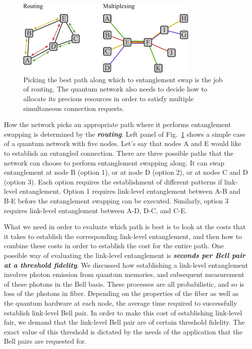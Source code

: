 \begin{figure}[t]
    \centering
    \includegraphics[width=0.8\textwidth]{lesson12/12-5_routing_multiplexing.pdf}
    \caption[Routing and multiplexing]{Picking the best path along which to entanglement swap is the job of routing. The quantum network also needs to decide how to allocate its precious resources in order to satisfy multiple simultaneous connection requests.}
    \label{fig:12-5_routing_multiplexing}
\end{figure}

How the network picks an appropriate path where it performs entanglement swapping is determined by the \textit{\textbf{routing}}.
Left panel of Fig.~\ref{fig:12-5_routing_multiplexing} shows a simple case of a quantum network with five nodes.
Let's say that nodes A and E would like to establish an entangled connection.
There are three possible paths that the network can choose to perform entanglement swapping along.
It can swap entanglement at node B (option 1), or at node D (option 2), or at nodes C and D (option 3).
Each option requires the establishment of different patterns if link-level entanglement.
Option 1 requires link-level entanglement between A-B and B-E before the entanglement swapping can be executed.
Similarly, option 3 requires link-level entanglement between A-D, D-C, and C-E.

What we need in order to evaluate which path is best is to look at the costs that it takes to establish the corresponding link-level entanglement, and then how to combine these costs in order to establish the cost for the entire path.
One possible way of evaluating the link-level entanglement is \textit{\textbf{seconds per Bell pair at a threshold fidelity}}.
We discussed how establishing a link-level entanglement involves photon emission from quantum memories, and subsequent measurement of these photons in the Bell basis.
These processes are all probabilistic, and so is loss of the photons in fiber.
Depending on the properties of the fiber as well as the quantum hardware at each node, the average time required to successfully establish link-level Bell pair.
In order to make this cost of establishing link-level fair, we demand that the link-level Bell pair are of certain threshold fidelity.
The exact value of this threshold is dictated by the needs of the application that the Bell pairs are requested for.

